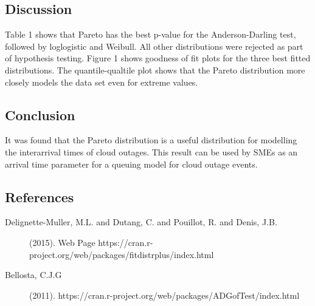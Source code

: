 \documentclass[12pt,a4paper]{article}
\begin{document}
\vspace{-8mm}

\subsection*{Discussion}
Table 1 shows that Pareto has the best p-value for the Anderson-Darling test, followed by loglogistic and Weibull. All other distributions were rejected as part of hypothesis testing. Figure 1 shows goodness of fit plots for the three best fitted distributions. The quantile-qualtile plot shows that the Pareto distribution more closely models the data set even for extreme values.


\subsection*{Conclusion}

It was found that the Pareto distribution is a useful distribution for modelling the interarrival times of cloud outages. This result can be used by SMEs as an arrival time parameter for a queuing model for cloud outage events. 

\subsection*{References}
\small
\begin{description}
\item[Delignette-Muller, M.L. and Dutang, C. and Pouillot, R. and Denis, J.B.] (2015). 
	Web Page https://cran.r-project.org/web/packages/fitdistrplus/index.html
\item[Bellosta, C.J.G] (2011).
	https://cran.r-project.org/web/packages/ADGofTest/index.html
\end{description}
\end{document}
